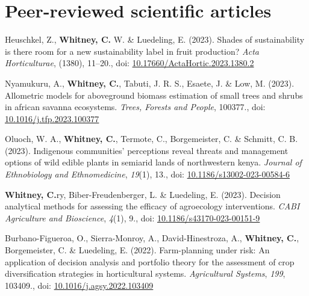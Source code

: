 \documentclass[11pt,a4paper,]{awesome-cv}
\newlength{\cslhangindent}
\newenvironment{CSLReferences}[2] %
 {\begin{list}{}{%
  \setlength{\itemindent}{0pt}
  \setlength{\leftmargin}{0pt}
  \setlength{\parsep}{0pt}
  \ifodd #1
   \setlength{\leftmargin}{\cslhangindent}
   \setlength{\itemindent}{-1\cslhangindent}
  \fi
  \setlength{\itemsep}{#2\baselineskip}}}
 {\end{list}}
\begin{document}
\section{Peer-reviewed scientific
articles}\label{peer-reviewed-scientific-articles}

\label{refs-26a4fdfe72d36d703c668018ccb1ca5f}
\begin{CSLReferences}{1}{0}
Heuschkel, Z., \textbf{Whitney, C.} W. \& Luedeling, E. (2023). Shades
of sustainability is there room for a new sustainability label in fruit
production? \emph{Acta Horticulturae}, (1380), 11--20., doi:
\href{https://doi.org/10.17660/ActaHortic.2023.1380.2}{10.17660/ActaHortic.2023.1380.2}

Nyamukuru, A., \textbf{Whitney, C.}, Tabuti, J. R. S., Esaete, J. \&
Low, M. (2023). Allometric models for aboveground biomass estimation of
small trees and shrubs in african savanna ecosystems. \emph{Trees,
Forests and People}, 100377., doi:
\href{https://doi.org/10.1016/j.tfp.2023.100377}{10.1016/j.tfp.2023.100377}

Oluoch, W. A., \textbf{Whitney, C.}, Termote, C., Borgemeister, C. \&
Schmitt, C. B. (2023). Indigenous communities' perceptions reveal
threats and management options of wild edible plants in semiarid lands
of northwestern kenya. \emph{Journal of Ethnobiology and Ethnomedicine},
\emph{19}(1), 13., doi:
\href{https://doi.org/10.1186/s13002-023-00584-6}{10.1186/s13002-023-00584-6}

\textbf{Whitney, C.}ry, Biber-Freudenberger, L. \& Luedeling, E. (2023).
Decision analytical methods for assessing the efficacy of agroecology
interventions. \emph{CABI Agriculture and Bioscience}, \emph{4}(1), 9.,
doi:
\href{https://doi.org/10.1186/s43170-023-00151-9}{10.1186/s43170-023-00151-9}

Burbano-Figueroa, O., Sierra-Monroy, A., David-Hinestroza, A.,
\textbf{Whitney, C.}, Borgemeister, C. \& Luedeling, E. (2022).
Farm-planning under risk: An application of decision analysis and
portfolio theory for the assessment of crop diversification strategies
in horticultural systems. \emph{Agricultural Systems}, \emph{199},
103409., doi:
\href{https://doi.org/10.1016/j.agsy.2022.103409}{10.1016/j.agsy.2022.103409}


\end{CSLReferences}
\end{document}

